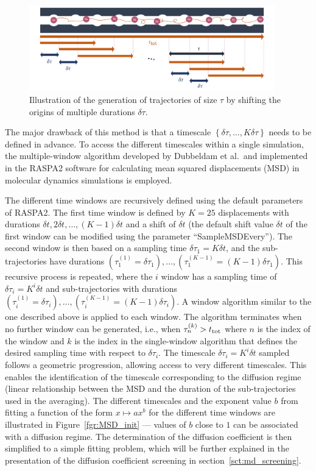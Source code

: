 \documentclass[main]{subfiles}
\begin{document}
\begin{figure}[ht]
  \centering
    \includegraphics[width=0.95\textwidth]{figures/5-diffusion/diffusion_averaging.pdf}
    \caption{Illustration of the generation of trajectories of size $\tau$ by shifting the origins of multiple durations $\delta\tau$. }\label{fgr:window_msd}
\end{figure}

The major drawback of this method is that a timescale $\left\{\delta\tau, \ldots, K\delta\tau\right\}$ needs to be defined in advance. To access the different timescales within a single simulation, the multiple-window algorithm developed by Dubbeldam et al.\ and implemented in the RASPA2 software for calculating mean squared displacements (MSD) in molecular dynamics simulations is employed.

The different time windows are recursively defined using the default parameters of RASPA2. The first time window is defined by $K=25$ displacements with durations $\delta t, 2\delta t, \ldots,(K-1)\delta t$ and a shift of $\delta t$ (the default shift value $\delta t$ of the first window can be modified using the parameter ``SampleMSDEvery''). The second window is then based on a sampling time $\delta \tau_1 = K\delta t$, and the sub-trajectories have durations $\left(\tau_1^{(1)} = \delta\tau_1\right),\ldots,\left(\tau_1^{(K-1)} = (K-1)\delta\tau_1\right)$. This recursive process is repeated, where the $i$ window has a sampling time of $\delta \tau_i = K^i\delta t$ and sub-trajectories with durations $\left(\tau_i^{(1)} = \delta\tau_i\right),\ldots,\left(\tau_i^{(K-1)} = (K-1)\delta\tau_i\right)$. A window algorithm similar to the one described above is applied to each window. The algorithm terminates when no further window can be generated, i.e., when $\tau_n^{(k)}>t_{\text{tot}}$ where $n$ is the index of the window and $k$ is the index in the single-window algorithm that defines the desired sampling time with respect to $\delta\tau_i$. The timescale $\delta \tau_i = K^i\delta t$ sampled follows a geometric progression, allowing access to very different timescales. This enables the identification of the timescale corresponding to the diffusion regime (linear relationship between the MSD and the duration of the sub-trajectories used in the averaging). The different timescales and the exponent value $b$ from fitting a function of the form $x \mapsto ax^b$ for the different time windows are illustrated in Figure~\ref{fgr:MSD_init} --- values of $b$ close to $1$ can be associated with a diffusion regime. The determination of the diffusion coefficient is then simplified to a simple fitting problem, which will be further explained in the presentation of the diffusion coefficient screening in section~\ref{sct:md_screening}.
\end{document}

